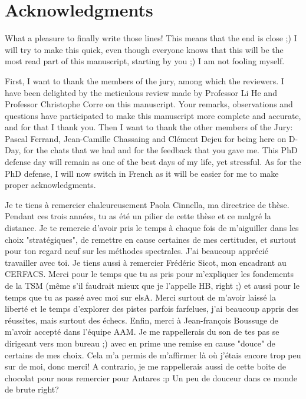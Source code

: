 
\chapter*{Acknowledgments}
\thispagestyle{empty}

What a pleasure to finally write those lines! This means that
the end is close ;)
I will try to make this quick, even though everyone knows that this
will be the most read part of this manuscript, starting by you ;)
I am not fooling myself.

First, I want to thank the members of the jury, among which the
reviewers. I have been
delighted by the meticulous review made by Professor Li He and Professor 
Christophe Corre on this manuscript. Your remarks, observations
and questions
have participated to make this manuscript more complete and accurate, and
for that I thank you.
Then I want to thank the other members of the Jury: Pascal Ferrand, 
Jean-Camille Chassaing and Clément Dejeu for being here on D-Day,
for the chats that we had
and for the feedback that you gave me. This PhD defense day will remain as one of the
best days of my life, yet stressful.
As for the PhD defense, I will now switch in French as it will
be easier for me to make proper acknowledgments.

Je te tiens à remercier chaleureusement Paola Cinnella, ma
directrice de thèse. Pendant ces trois années, tu as été un pilier
de cette thèse et ce malgré la distance. 
Je te remercie d'avoir pris le temps à chaque fois
de m'aiguiller dans les choix "stratégiques", de remettre en cause
certaines de mes certitudes, et surtout pour ton regard neuf sur les méthodes
spectrales. J'ai beaucoup apprécié travailler avec toi.
Je tiens aussi à remercier Frédéric Sicot, mon encadrant au CERFACS.
Merci pour le temps que tu as pris pour m'expliquer les fondements de 
la TSM (même s'il faudrait mieux que je l'appelle HB, right ;)
et aussi pour le temps que tu as passé avec moi sur elsA. 
Merci surtout de m'avoir laissé la liberté et le temps
d'explorer des pistes parfois farfelues, j'ai beaucoup appris 
des réussites, mais surtout des échecs. Enfin, merci à Jean-françois Boussuge
de m'avoir accepté dans l'équipe AAM.
Je me rappellerais du son
de tes pas se dirigeant vers mon bureau ;) avec
en prime une remise en cause "douce" de certains de mes choix.
Cela m'a permis de m'affirmer là où j'étais encore trop
peu sur de moi, donc merci! A contrario, je me rappellerais aussi 
de cette boite de chocolat pour nous remercier pour Antares :p
Un peu de douceur dans ce monde de brute right?

